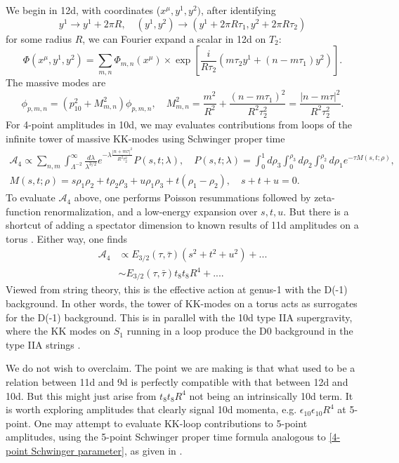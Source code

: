We begin in 12d, with coordinates ($x^\mu,y^1,y^2)$, after identifying
\begin{equation}
y^1\to y^1+2\pi R,\quad
(y^1,y^2)\to (y^1+2\pi R\tau_1,y^2+2\pi R\tau_2)
\end{equation}
for some radius $R$, we can Fourier expand a scalar in 12d on $T_2$:
\begin{equation}
\Phi(x^\mu,y^1,y^2)
=\sum_{m,n}\Phi_{m,n}(x^\mu) \times\exp
\left[
\frac{i}{R\tau_2}\left(m\tau_2y^1 + (n-m\tau_1)y^2\right)
\right].
\end{equation}
The massive modes are
\begin{equation}
[-\nabla^2_{10}-\nabla^2_2]\phi_{p,m,n}
=\left(p_{10}^2+M_{m,n}^2\right)\phi_{p,m,n},\quad
M^2_{m,n} 
= \frac{m^2}{R^2}+\frac{(n-m\tau_1)^2}{R^2\tau_2^2}
=\frac{|n-m\tau|^2}{R^2\tau_2^2}.
\end{equation}
For 4-point amplitudes in 10d, we may evaluates contributions from loops of the infinite tower of massive KK-modes using Schwinger proper time
\cite{Green:1997as,Beccaria:2023hhi}
\begin{equation}
\begin{aligned}
\mathcal{A}_4
\propto \sum_{n,m}\int_{\Lambda^{-2}}^\infty
\frac{d\lambda}{\lambda^{3/2}}
e^{-\lambda \frac{|n+m\tau|^2}{R^2\tau_2^2}}
P(s,t;\lambda),\quad
P(s,t;\lambda)
=\int_0^1d\rho_3 \int_0^{\rho_3}d\rho_2\int_0^{\rho_2} d\rho_1e^{-\tau M(s,t;\rho)},\\
M(s,t;\rho)=s\rho_1\rho_2+t\rho_2\rho_3+u\rho_1\rho_3 + t(\rho_1-\rho_2),\quad
s+t+u=0.
\end{aligned}
\label{4-point Schwinger parameter}
\end{equation}
To evaluate $\mathcal{A}_4$ above, one performs Poisson resummations followed by zeta-function renormalization, and a low-energy expansion over $s,t,u$.
But there is a shortcut of adding a spectator dimension to known results of 11d amplitudes on a torus \cite{Green:1997as}.
Either way, one finds
\begin{equation}
\begin{aligned}
\mathcal{A}_4
&\propto  E_{3/2}(\tau,\bar\tau)(s^2+t^2+u^2)+...\\
&\sim E_{3/2}(\tau,\bar\tau)t_8t_8R^4+....
\end{aligned}
\end{equation}
Viewed from string theory, this is the effective action at genus-1 with the D(-1) background.
In other words, the tower of KK-modes on a torus acts as surrogates for the D(-1) background.
This is in parallel with the 10d type IIA supergravity, where the KK modes on $S_1$ running in a loop produce the D0 background in the type IIA strings \cite{Green:1997as}.

We do not wish to overclaim.
The point we are making is that what used to be a relation between 11d and 9d \cite{Green:1997as} is perfectly compatible with that between 12d and 10d.
But this might just arise from $t_8t_8 R^4$ not being an intrinsically 10d term.
It is worth exploring amplitudes that clearly signal 10d momenta, e.g. $\epsilon_{10}\epsilon_{10}R^4$ at 5-point.
One may attempt to evaluate KK-loop contributions to 5-point amplitudes, using the 5-point Schwinger proper time formula analogous to \eqref{4-point Schwinger parameter}, as given in \cite{Minasian:2015bxa,Green:1999by,Liu:2022bfg}.